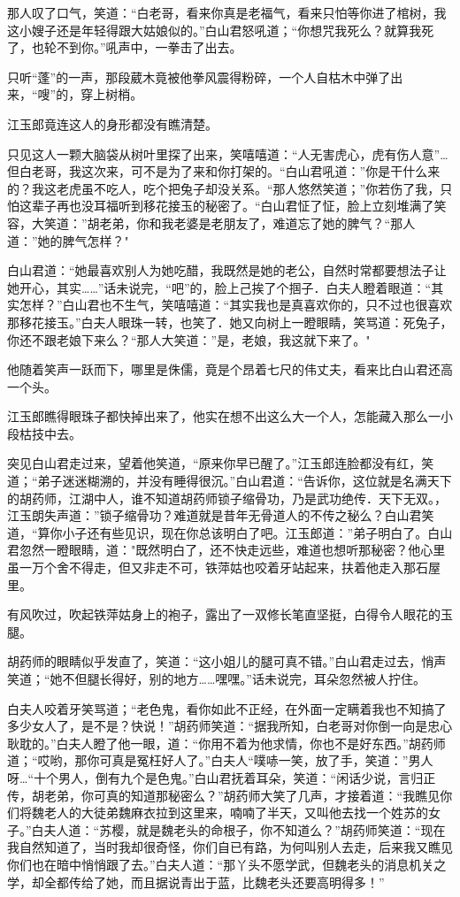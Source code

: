 \documentclass[12pt,oneside]{book}
\begin{document}
那人叹了口气，笑道：``白老哥，看来你真是老福气，看来只怕等你进了棺树，我这小嫂子还是年轻得跟大姑娘似的。''白山君怒吼道；``你想咒我死么？就算我死了，也轮不到你。''吼声中，一拳击了出去。

只听``蓬''的一声，那段葳木竟被他拳风震得粉碎，一个人自枯木中弹了出来，``嗖''的，穿上树梢。

江玉郎竟连这人的身形都没有瞧清楚。

只见这人一颗大脑袋从树叶里探了出来，笑嘻嘻道：``人无害虎心，虎有伤人意''\ldots 但白老哥，我这次来，可不是为了来和你打架的。``白山君吼道：''你是干什么来的？我这老虎虽不吃人，吃个把兔子却没关系。``那人悠然笑道；''你若伤了我，只怕这辈子再也没耳福听到移花接玉的秘密了。``白山君怔了怔，脸上立刻堆满了笑容，大笑道：''胡老弟，你和我老婆是老朋友了，难道忘了她的脾气？``那人道：''她的脾气怎样？"

白山君道：``她最喜欢别人为她吃醋，我既然是她的老公，自然时常都要想法子让她开心，其实\ldots\ldots{}''话未说完，``吧''的，脸上己挨了个掴子．白夫人瞪着眼道：``其实怎样？''白山君也不生气，笑嘻嘻道：``其实我也是真喜欢你的，只不过也很喜欢那移花接玉。''白夫人眼珠一转，也笑了．她又向树上一瞪眼睛，笑骂道：死兔子，你还不跟老娘下来么？``那人大笑道：''是，老娘，我这就下来了。"

他随着笑声一跃而下，哪里是侏儒，竟是个昂着七尺的伟丈夫，看来比白山君还高一个头。

江玉郎瞧得眼珠子都快掉出来了，他实在想不出这么大一个人，怎能藏入那么一小段枯技中去。

突见白山君走过来，望着他笑道，``原来你早已醒了。''江玉郎连脸都没有红，笑道；``弟子迷迷糊溯的，并没有睡得很沉。''白山君道：``告诉你，这位就是名满天下的胡药师，江湖中人，谁不知道胡药师锁子缩骨功，乃是武功绝传．天下无双。，江玉朗失声道：''锁子缩骨功？难道就是昔年无骨道人的不传之秘么？白山君笑道，``算你小子还有些见识，现在你总该明白了吧。江玉郎道：''弟子明白了。白山君忽然一瞪眼睛，道："既然明白了，还不快走远些，难道也想听那秘密？他心里虽一万个舍不得走，但又非走不可，铁萍姑也咬着牙站起来，扶着他走入那石屋里。

有风吹过，吹起铁萍姑身上的袍子，露出了一双修长笔直坚挺，白得令人眼花的玉腿。

胡药师的眼睛似乎发直了，笑道：``这小姐儿的腿可真不错。''白山君走过去，悄声笑道；``她不但腿长得好，别的地方\ldots\ldots 嘿嘿。''话未说完，耳朵忽然被人拧住。

白夫人咬着牙笑骂道；``老色鬼，看你如此不正经，在外面一定瞒着我也不知搞了多少女人了，是不是？快说！''胡药师笑道：``据我所知，白老哥对你倒一向是忠心耿耽的。''白夫人瞪了他一眼，道：``你用不着为他求情，你也不是好东西。''胡药师道；``哎哟，那你可真是冤枉好人了。''白夫人``噗哧一笑，放了手，笑道：''男人呀\ldots{}``十个男人，倒有九个是色鬼。''白山君抚着耳朵，笑道：``闲话少说，言归正传，胡老弟，你可真的知道那秘密么？''胡药师大笑了几声，才接着道：``我瞧见你们将魏老人的大徒弟魏麻衣拉到这里来，喃喃了半天，又叫他去找一个姓苏的女子。''白夫人道：``苏樱，就是魏老头的命根子，你不知道么？''胡药师笑道：``现在我自然知道了，当时我却很奇怪，你们自已有路，为何叫别人去走，后来我又瞧见你们也在暗中悄悄跟了去。''白夫人道：``那丫头不愿学武，但魏老头的消息机关之学，却全都传给了她，而且据说青出于蓝，比魏老头还要高明得多！''
\end{document}
